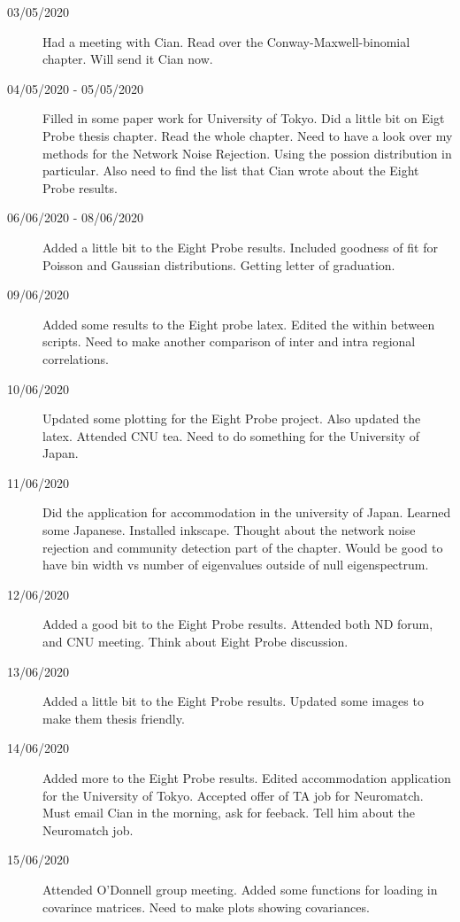 \documentclass[a4paper,12pt]{article}
\theoremstyle{definition}
\begin{document}
\begin{description}
	\item[03/05/2020] Had a meeting with Cian. Read over the Conway-Maxwell-binomial chapter. Will send it Cian now.

	\item[04/05/2020 - 05/05/2020] Filled in some paper work for University of Tokyo. Did a little bit on Eigt Probe thesis chapter. Read the whole chapter. Need to have a look over my methods for the Network Noise Rejection. Using the possion distribution in particular. Also need to find the list that Cian wrote about the Eight Probe results.

	\item[06/06/2020 - 08/06/2020] Added a little bit to the Eight Probe results. Included goodness of fit for Poisson and Gaussian distributions. Getting letter of graduation.

	\item[09/06/2020] Added some results to the Eight probe latex. Edited the within between scripts. Need to make another comparison of inter and intra regional correlations.

	\item[10/06/2020] Updated some plotting for the Eight Probe project. Also updated the latex. Attended CNU tea. Need to do something for the University of Japan.

	\item[11/06/2020] Did the application for accommodation in the university of Japan. Learned some Japanese. Installed inkscape. Thought about the network noise rejection and community detection part of the chapter. Would be good to have bin width vs number of eigenvalues outside of null eigenspectrum.

	\item[12/06/2020] Added a good bit to the Eight Probe results. Attended both ND forum, and CNU meeting. Think about Eight Probe discussion.

	\item[13/06/2020] Added a little bit to the Eight Probe results. Updated some images to make them thesis friendly.

	\item[14/06/2020] Added more to the Eight Probe results. Edited accommodation application for the University of Tokyo. Accepted offer of TA job for Neuromatch. Must email Cian in the morning, ask for feeback. Tell him about the Neuromatch job.

  \item[15/06/2020] Attended O'Donnell group meeting. Added some functions for loading in covarince matrices. Need to make plots showing covariances.


\end{description}
\end{document}
